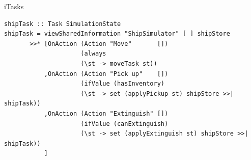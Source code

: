 \documentclass{beamer}
\begin{document}
\begin{frame}[fragile]{iTasks}
\begin{Verbatim}[fontsize=\scriptsize]
shipTask :: Task SimulationState
shipTask = viewSharedInformation "ShipSimulator" [ ] shipStore
       >>* [OnAction (Action "Move"       [])
                     (always
                     (\st -> moveTask st))
           ,OnAction (Action "Pick up"    [])
                     (ifValue (hasInventory)
                     (\st -> set (applyPickup st) shipStore >>| shipTask))
           ,OnAction (Action "Extinguish" [])
                     (ifValue (canExtinguish)
                     (\st -> set (applyExtinguish st) shipStore >>| shipTask))
           ]
\end{Verbatim}
\end{frame}
\end{document}
